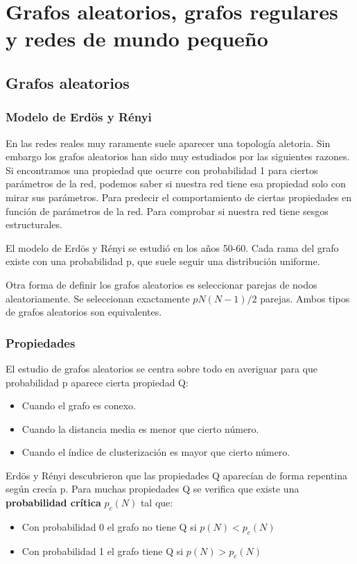 \chapter{Grafos aleatorios, grafos regulares y redes de mundo pequeño}
\section{Grafos aleatorios}
\subsection{Modelo de Erdös y Rényi}
En las redes reales muy raramente suele aparecer una topología aletoria. Sin embargo los grafos aleatorios han sido muy estudiados por las siguientes razones. Si encontramos una propiedad que ocurre con probabilidad 1 para ciertos parámetros de la red, podemos saber si nuestra red tiene esa propiedad solo con mirar sus parámetros. Para predecir el comportamiento de ciertas propiedades en función de parámetros de la red. Para comprobar si nuestra red tiene sesgos estructurales.

El modelo de Erdös y Rényi  se estudió en los años 50-60. Cada rama del grafo existe con una probabilidad p, que suele seguir una distribución uniforme.

Otra forma de definir los grafos aleatorios es seleccionar parejas de nodos aleatoriamente. Se seleccionan exactamente $pN(N-1)/2$ parejas. Ambos tipos de grafos aleatorios son equivalentes.

\subsection{Propiedades}
El estudio de grafos aleatorios se centra sobre todo en averiguar para que probabilidad p aparece cierta propiedad Q:
\begin{itemize}
\item Cuando el grafo es conexo.
\item Cuando la distancia media es menor que cierto número.
\item Cuando el índice de clusterización es mayor que cierto número.
\end{itemize}

Erdös y Rényi descubrieron que las propiedades Q aparecían de forma repentina según crecía p. Para muchas propiedades Q se verifica que existe una \textbf{probabilidad crítica} $p_c(N)$ tal que:
\begin{itemize}
\item Con probabilidad 0 el grafo no tiene Q si $p(N) < p_c(N)$
\item Con probabilidad 1 el grafo tiene Q si $p(N) > p_c(N)$
\end{itemize}

